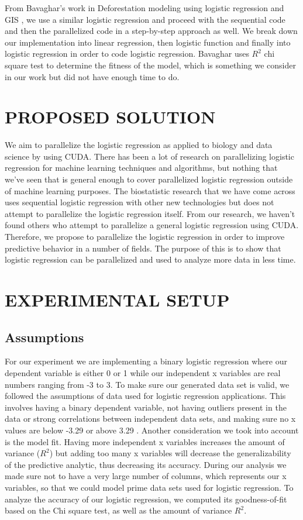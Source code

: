 \documentclass[letterpaper, 10 pt, conference]{ieeeconf}  %
\begin{document}
From Bavaghar's work in Deforestation modeling using logistic regression and GIS \cite{c1}, we use a similar logistic regression and proceed with the sequential code and then the parallelized code in a step-by-step approach as well. We break down our implementation into linear regression, then logistic function and finally into logistic regression in order to code logistic regression. Bavaghar uses $R^2$ chi square test to determine the fitness of the model, which is something we consider in our work but did not have enough time to do.


\section{PROPOSED SOLUTION}
We aim to parallelize the logistic regression as applied to biology and data science by using CUDA. There has been a lot of research on parallelizing logistic regression for machine learning techniques and algorithms, but nothing that we’ve seen that is general enough to cover parallelized logistic regression outside of machine learning purposes. The biostatistic research that we have come across uses sequential logistic regression with other new technologies but does not attempt to parallelize the logistic regression itself. From our research, we haven’t found others who attempt to parallelize a general logistic regression using CUDA. Therefore, we propose to parallelize the logistic regression in order to improve predictive behavior in a number of fields. The purpose of this is to show that logistic regression can be parallelized and used to analyze more data in less time.

\section{EXPERIMENTAL SETUP}

\subsection{Assumptions}
For our experiment we are implementing a binary logistic regression where our dependent variable is either 0 or 1 while our independent x variables are real numbers ranging from -3 to 3. To make sure our generated data set is valid, we followed the assumptions of data used for logistic regression applications. This involves having a binary dependent variable, not having outliers present in the data or strong correlations between independent data sets, and making sure no x values are below -3.29 or above 3.29 \cite{c8}. Another consideration we took into account is the model fit. Having more independent x variables increases the amount of variance ($R^2$) but adding too many x variables will decrease the generalizability of the predictive analytic, thus decreasing its accuracy. During our analysis we made sure not to have a very large number of columns, which represents our x variables, so that we could model prime data sets used for logistic regression. To analyze the accuracy of our logistic regression, we computed its goodness-of-fit based on the Chi square test, as well as the amount of variance $R^2$. 
\end{document}
